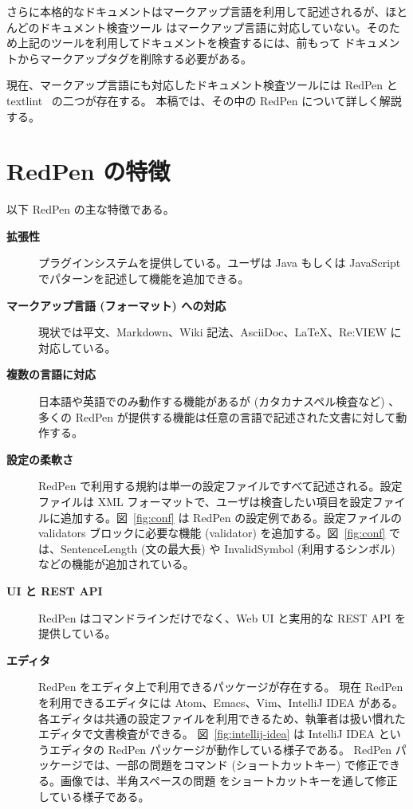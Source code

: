 さらに本格的なドキュメントはマークアップ言語を利用して記述されるが、ほとんどのドキュメント検査ツール
はマークアップ言語に対応していない。そのため上記のツールを利用してドキュメントを検査するには、前もって
ドキュメントからマークアップタグを削除する必要がある。

現在、マークアップ言語にも対応したドキュメント検査ツールには RedPen と textlint~\cite{textlint} の二つが存在する。
本稿では、その中の RedPen について詳しく解説する。

\section{RedPen の特徴}

以下 RedPen の主な特徴である。

\begin{description}
\item[{\bf 拡張性}]
  プラグインシステムを提供している。ユーザは Java もしくは JavaScript でパターンを記述して機能を追加できる。

\item[{\bf マークアップ言語 (フォーマット) への対応}]
  現状では平文、Markdown、Wiki 記法、AsciiDoc、LaTeX、Re:VIEW に対応している。

\item[{\bf 複数の言語に対応}]
  日本語や英語でのみ動作する機能があるが (カタカナスペル検査など) 、多くの RedPen が提供する機能は任意の言語で記述された文書に対して動作する。

\item[{\bf 設定の柔軟さ}]
  RedPen で利用する規約は単一の設定ファイルですべて記述される。設定ファイルは XML フォーマットで、ユーザは検査したい項目を設定ファイルに追加する。図~\ref{fig:conf} は RedPen の設定例である。設定ファイルの validators ブロックに必要な機能 (validator) を追加する。図~\ref{fig:conf} では、SentenceLength (文の最大長) や InvalidSymbol (利用するシンボル) などの機能が追加されている。

\item[{\bf UI と REST API}]
  RedPen はコマンドラインだけでなく、Web UI と実用的な REST API を提供している。

\item[{\bf エディタ}]
  RedPen をエディタ上で利用できるパッケージが存在する。
  現在 RedPen を利用できるエディタには Atom、Emacs、Vim、IntelliJ IDEA がある。
  各エディタは共通の設定ファイルを利用できるため、執筆者は扱い慣れたエディタで文書検査ができる。
  図~\ref{fig:intellij-idea} は IntelliJ IDEA というエディタの RedPen パッケージが動作している様子である。
  RedPen パッケージでは、一部の問題をコマンド (ショートカットキー) で修正できる。画像では、半角スペースの問題
  をショートカットキーを通して修正している様子である。
\end{description}

